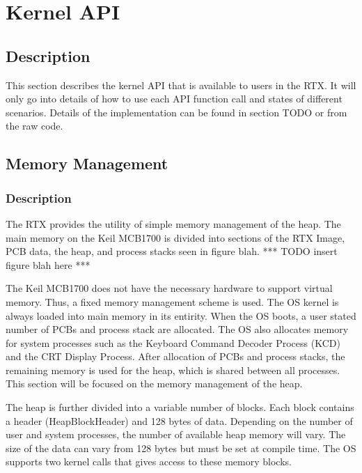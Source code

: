\documentclass[12pt]{report}
\begin{document}
\chapter{Kernel API}
\section{Description}
This section describes the kernel API that is available to users in the RTX. It will only go into details of how to use each API function call and states of different scenarios. Details of the implementation can be found in section TODO or from the raw code.

\section{Memory Management}
\subsection{Description}
The RTX provides the utility of simple memory management of the heap. The main memory on the Keil MCB1700 is divided into sections of the RTX Image, PCB data, the heap, and process stacks seen in figure blah.
*** TODO insert figure blah here ***

The Keil MCB1700 does not have the necessary hardware to support virtual memory. Thus, a fixed memory management scheme is used. The OS kernel is always loaded into main memory in its entirity. When the OS boots, a user stated number of PCBs and process stack are allocated. The OS also allocates memory for system processes such as the Keyboard Command Decoder Process (KCD) and the CRT Display Process. After allocation of PCBs and process stacks, the remaining memory is used for the heap, which is shared between all processes. This section will be focused on the memory management of the heap.

The heap is further divided into a variable number of blocks. Each block contains a header (HeapBlockHeader) and 128 bytes of data. Depending on the number of user and system processes, the number of available heap memory will vary. The size of the data can vary from 128 bytes but must be set at compile time. The OS supports two kernel calls that gives access to these memory blocks.
\end{document}

